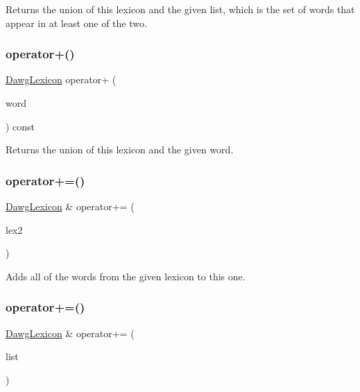 Returns the union of this lexicon and the given list, which is the set of words that appear in at least one of the two. 

\mbox{\label{classDawgLexicon_a218cb40b0674a3db9a362e5b878f7bce}} 
\subsubsection{\texorpdfstring{operator+()}{operator+()}\hspace{0.1cm}{\footnotesize\ttfamily [3/3]}}
{\footnotesize\ttfamily \mbox{\hyperlink{classDawgLexicon}{Dawg\+Lexicon}} operator+ (\begin{DoxyParamCaption}\item[{const std\+::string \&}]{word }\end{DoxyParamCaption}) const}



Returns the union of this lexicon and the given word. 

\mbox{\label{classDawgLexicon_a4f69eb7a84edf9a91861e7083305e501}} 
\subsubsection{\texorpdfstring{operator+=()}{operator+=()}\hspace{0.1cm}{\footnotesize\ttfamily [1/3]}}
{\footnotesize\ttfamily \mbox{\hyperlink{classDawgLexicon}{Dawg\+Lexicon}} \& operator+= (\begin{DoxyParamCaption}\item[{const \mbox{\hyperlink{classDawgLexicon}{Dawg\+Lexicon}} \&}]{lex2 }\end{DoxyParamCaption})}



Adds all of the words from the given lexicon to this one. 

\mbox{\label{classDawgLexicon_a30565b5b4fdd5efeb9c11fb1943a1d90}} 
\subsubsection{\texorpdfstring{operator+=()}{operator+=()}\hspace{0.1cm}{\footnotesize\ttfamily [2/3]}}
{\footnotesize\ttfamily \mbox{\hyperlink{classDawgLexicon}{Dawg\+Lexicon}} \& operator+= (\begin{DoxyParamCaption}\item[{std\+::initializer\+\_\+list$<$ std\+::string $>$}]{list }\end{DoxyParamCaption})}



